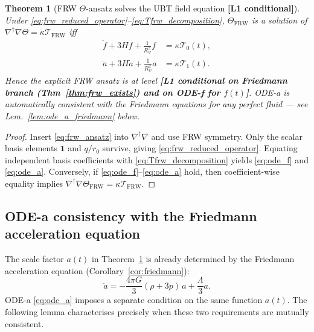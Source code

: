 \documentclass[12pt,a4paper]{article}
\newtheorem{theorem}{Theorem}[section]
\theoremstyle{definition}
\theoremstyle{remark}
\begin{document}
\begin{theorem}[FRW $\Theta$-ansatz solves the UBT field equation \textbf{[L1 conditional]}]
\label{thm:frw_ansatz_l1}
Under \eqref{eq:frw_reduced_operator}--\eqref{eq:Tfrw_decomposition},
$\Theta_{\mathrm{FRW}}$ is a solution of
$\nabla^\dagger\nabla\Theta = \kappa\mathcal{T}_{\mathrm{FRW}}$
iff
\begin{align}
  \ddot f + 3H\dot f + \frac{1}{R_\psi^2}f &= \kappa\mathcal{T}_0(t), \label{eq:ode_f}\\
  \ddot a + 3H\dot a + \frac{1}{R_\psi^2}a &= \kappa\mathcal{T}_1(t). \label{eq:ode_a}
\end{align}
Hence the explicit FRW ansatz is at level \textbf{[L1 conditional on Friedmann branch
(Thm~\ref{thm:frw_exists}) and on ODE-f for $f(t)$]}.
ODE-a is automatically consistent with the Friedmann equations for any perfect
fluid --- see Lem.~\ref{lem:ode_a_friedmann} below.
\end{theorem}

\begin{proof}
Insert \eqref{eq:frw_ansatz} into $\nabla^\dagger\nabla$ and use FRW symmetry.
Only the scalar basis elements $\mathbf{1}$ and $q/r_0$ survive, giving
\eqref{eq:frw_reduced_operator}. Equating independent basis coefficients with
\eqref{eq:Tfrw_decomposition} yields \eqref{eq:ode_f} and \eqref{eq:ode_a}.
Conversely, if \eqref{eq:ode_f}--\eqref{eq:ode_a} hold, then coefficient-wise
equality implies $\nabla^\dagger\nabla\Theta_{\mathrm{FRW}}=\kappa\mathcal{T}_{\mathrm{FRW}}$.
\end{proof}

\subsection{ODE-a consistency with the Friedmann acceleration equation}
\label{ssec:ode_a_consistency}

The scale factor $a(t)$ in Theorem~\ref{thm:frw_ansatz_l1} is already determined
by the Friedmann acceleration equation (Corollary~\ref{cor:friedmann}):
\begin{equation}
  \label{eq:friedmann_accel}
  \ddot{a} = -\frac{4\pi G}{3}(\rho+3p)\,a + \frac{\Lambda}{3}a.
\end{equation}
ODE-a \eqref{eq:ode_a} imposes a separate condition on the same function $a(t)$.
The following lemma characterises precisely when these two requirements are
mutually consistent.
\end{document}
